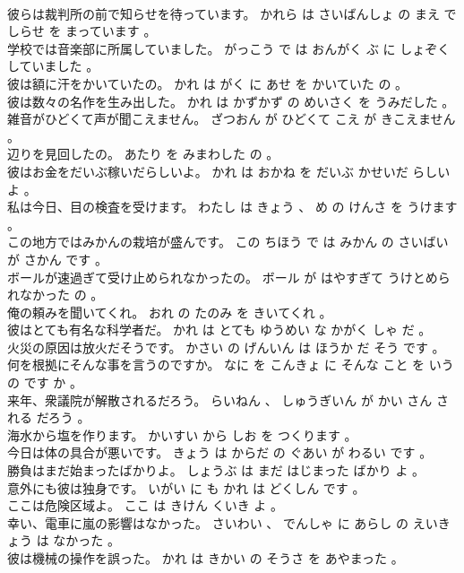 \documentclass[8pt]{extreport}
\begin{document}
\begin{CJK}{UTF8}{min}
\\	彼らは裁判所の前で知らせを待っています。	かれら は さいばんしょ の まえ で しらせ を まっています 。 
\\	学校では音楽部に所属していました。	がっこう で は おんがく ぶ に しょぞく していました 。 
\\	彼は額に汗をかいていたの。	かれ は がく に あせ を かいていた の 。 
\\	彼は数々の名作を生み出した。	かれ は かずかず の めいさく を うみだした 。 
\\	雑音がひどくて声が聞こえません。	ざつおん が ひどくて こえ が きこえません 。 
\\	辺りを見回したの。	あたり を みまわした の 。 
\\	彼はお金をだいぶ稼いだらしいよ。	かれ は おかね を だいぶ かせいだ らしい よ 。 
\\	私は今日、目の検査を受けます。	わたし は きょう 、 め の けんさ を うけます 。 
\\	この地方ではみかんの栽培が盛んです。	この ちほう で は みかん の さいばい が さかん です 。 
\\	ボールが速過ぎて受け止められなかったの。	ボール が はやすぎて うけとめられなかった の 。 
\\	俺の頼みを聞いてくれ。	おれ の たのみ を きいてくれ 。 
\\	彼はとても有名な科学者だ。	かれ は とても ゆうめい な かがく しゃ だ 。 
\\	火災の原因は放火だそうです。	かさい の げんいん は ほうか だ そう です 。 
\\	何を根拠にそんな事を言うのですか。	なに を こんきょ に そんな こと を いう の です か 。 
\\	来年、衆議院が解散されるだろう。	らいねん 、 しゅうぎいん が かい さん される だろう 。 
\\	海水から塩を作ります。	かいすい から しお を つくります 。 
\\	今日は体の具合が悪いです。	きょう は からだ の ぐあい が わるい です 。 
\\	勝負はまだ始まったばかりよ。	しょうぶ は まだ はじまった ばかり よ 。 
\\	意外にも彼は独身です。	いがい に も かれ は どくしん です 。 
\\	ここは危険区域よ。	ここ は きけん くいき よ 。 
\\	幸い、電車に嵐の影響はなかった。	さいわい 、 でんしゃ に あらし の えいきょう は なかった 。 
\\	彼は機械の操作を誤った。	かれ は きかい の そうさ を あやまった 。 

\end{CJK}
\end{document}
